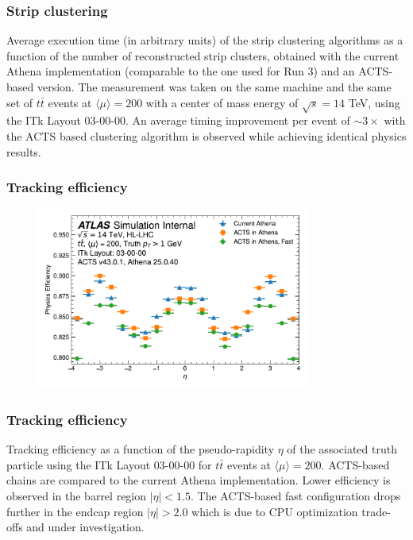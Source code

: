 \documentclass[aspectratio=169]{beamer}
\begin{document}
\begin{frame}
\frametitle{Strip clustering}
Average execution time (in arbitrary units) of the strip clustering algorithms as a function of the number of reconstructed strip clusters, obtained with the current Athena implementation (comparable to the one used for Run 3) and an ACTS-based version. The measurement was taken on the same machine and the same set of $t\bar{t}$ events at $\langle \mu \rangle = 200$ with a center of mass energy of $\sqrt{s}=14$ TeV, using the ITk Layout 03-00-00. An average timing improvement per event of $\sim3\times$ with the ACTS based clustering algorithm is observed while achieving identical physics results.
\end{frame}


\begin{frame}
\frametitle{Tracking efficiency}
\begin{figure}[h]
    \centering
    \includegraphics[width=0.8\textwidth]{plots/tracking_efficiency_physics.pdf}
\end{figure}
\end{frame}

\begin{frame}
\frametitle{Tracking efficiency}
Tracking efficiency as a function of the pseudo-rapidity $\eta$ of the associated truth particle using the ITk Layout 03-00-00 for $t\bar{t}$ events at $\langle \mu \rangle = 200$. ACTS-based chains are compared to the current Athena implementation. Lower efficiency is observed in the barrel region $|\eta| < 1.5$. The ACTS-based fast configuration drops further in the endcap region $|\eta| > 2.0$ which is due to CPU optimization trade-offs and under investigation.
\end{frame}
\end{document}
